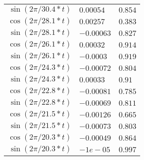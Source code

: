 \begin{tabular}{r|ll}
 $\sin(2\pi/30.4 * t)$  & $0.00054$     & $0.854$   \\
 $\cos(2\pi/28.1 * t)$  & $0.00257$     & $0.383$   \\
 $\sin(2\pi/28.1 * t)$  & $-0.00063$    & $0.827$   \\
 $\cos(2\pi/26.1 * t)$  & $0.00032$     & $0.914$   \\
 $\sin(2\pi/26.1 * t)$  & $-0.0003$     & $0.919$   \\
 $\cos(2\pi/24.3 * t)$  & $-0.00072$    & $0.804$   \\
 $\sin(2\pi/24.3 * t)$  & $0.00033$     & $0.91$    \\
 $\cos(2\pi/22.8 * t)$  & $-0.00081$    & $0.785$   \\
 $\sin(2\pi/22.8 * t)$  & $-0.00069$    & $0.811$   \\
 $\cos(2\pi/21.5 * t)$  & $-0.00126$    & $0.665$   \\
 $\sin(2\pi/21.5 * t)$  & $-0.00073$    & $0.803$   \\
 $\cos(2\pi/20.3 * t)$  & $-0.00049$    & $0.864$   \\
 $\sin(2\pi/20.3 * t)$  & $-1e-05$      & $0.997$   \\
\hline
\end{tabular}